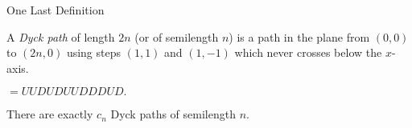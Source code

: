 \documentclass[xcolor=dvipsnames]{beamer}
\theoremstyle{definition}            %
\begin{document}
\begin{frame}{One Last Definition}
  \pause
  
  \begin{definition}
    A \emph{Dyck path} of length $2n$ (or of semilength $n$) is a
    path in the plane from $(0,0)$ to $(2n,0)$ using steps $(1,1)$ and
    $(1,-1)$ which never crosses below the $x$-axis. 
  \end{definition}
  \pause 

  \begin{example}
      $ = UUDUDUUDDDUD.$
  \end{example}
  \pause

  \begin{fact}
    There are exactly $c_n$ Dyck paths of semilength $n$.   
  \end{fact}

\end{frame}
\end{document}
